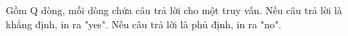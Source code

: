 Gồm Q dòng, mỗi dòng chứa câu trả lời cho một truy vấn. Nếu câu trả lời là khẳng định, in ra "yes". Nếu câu trả lời là phủ định, in ra "no".